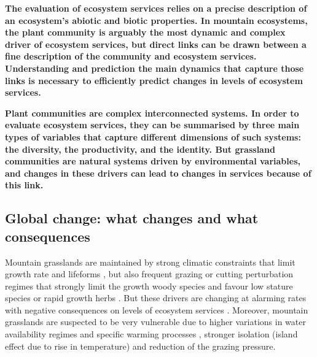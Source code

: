 
%




\textbf{The evaluation of ecosystem services relies on a precise description of an ecosystem's abiotic and biotic properties. In mountain ecosystems, the plant community is arguably the most dynamic and complex driver of ecosystem services, but direct links can be drawn between a fine description of the community and ecosystem services. Understanding and prediction the main dynamics that capture those links is necessary to efficiently predict changes in levels of ecosystem services.}

\textbf{Plant communities are complex interconnected systems. In order to evaluate ecosystem services, they can be summarised by three main types of variables that capture different dimensions of such systems: the diversity, the productivity, and the identity. But grassland communities are natural systems driven by environmental variables, and changes in these drivers can lead  to changes in services because of this link.}



\subsection{Global change: what changes and what consequences}

Mountain grasslands are maintained by strong climatic constraints that limit growth rate and lifeforms  \parencite{koorner_alpine_2003}, but also frequent grazing or cutting perturbation regimes that strongly limit the growth woody species and favour low stature species or rapid growth herbs \parencite{diaz_plant_2007}. But these drivers are changing at alarming rates with negative consequences on levels of ecosystem services \cite{schroter_ecosystem_2005}. Moreover, mountain grasslands are suspected to be very vulnerable \parencite{schroter_ecosystem_2005, engler_21st_2011} due to higher variations in water availability regimes and specific warming processes \parencite{mountain_research_initiative_edw_working_group_elevation-dependent_2015}, stronger isolation (island effect due to rise in temperature) and reduction of the grazing pressure.

